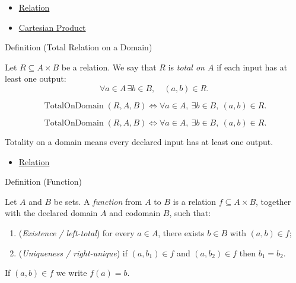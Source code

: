 \begin{dependencies}
\begin{itemize}
  \item \hyperref[def:relation]{Relation}
  \item \hyperref[def:cartesian-product-rel]{Cartesian Product}
\end{itemize}
\end{dependencies}

\begin{definitionbox}{Definition (Total Relation on a Domain)}
\begin{definition}\label{def:total-relation-on-domain}
Let $R\subseteq A\times B$ be a relation. We say that $R$ is \emph{total on
$A$} if each input has at least one output:
\[
\forall a\in A\,\exists b\in B,\quad (a,b)\in R.
\]
\end{definition}
\end{definitionbox}

\begin{remark*}
\[
  \operatorname{TotalOnDomain}(R,A,B)
  \iff
  \forall a\in A,\ \exists b\in B,\ (a,b)\in R.
\]
\end{remark*}

\begin{remark*}
\[
  \operatorname{TotalOnDomain}(R,A,B)
  \iff
  \forall a\in A,\ \exists b\in B,\ (a,b)\in R.
\]
\end{remark*}

\begin{remark*}[Interpretation]
Totality on a domain means every declared input has at least one output.
\end{remark*}

\begin{dependencies}
\begin{itemize}
  \item \hyperref[def:relation]{Relation}
\end{itemize}
\end{dependencies}

\begin{definitionbox}{Definition (Function)}
\begin{definition}[Function]\label{def:function}
Let $A$ and $B$ be sets. A \emph{function} from $A$ to $B$ is a relation
$f \subseteq A \times B$, together with the declared domain $A$ and codomain
$B$, such that:
\begin{enumerate}[label=(\roman*)]
\item (\emph{Existence / left-total}) for every $a \in A$, there exists $b \in B$
  with $(a,b) \in f$;
\item (\emph{Uniqueness / right-unique}) if $(a,b_1) \in f$ and $(a,b_2) \in f$
  then $b_1 = b_2$.
\end{enumerate}
If $(a,b) \in f$ we write $f(a) = b$.
\end{definition}
\end{definitionbox}

